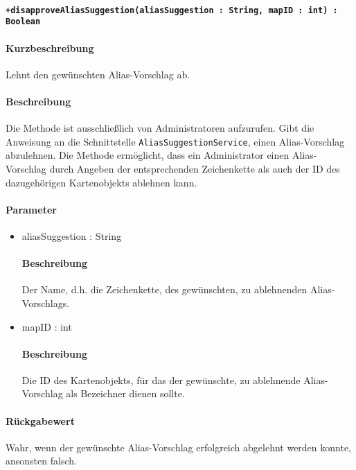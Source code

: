 \paragraph*{\texttt{+disapproveAliasSuggestion(aliasSuggestion : String, mapID : int) : Boolean}}%
\paragraph*{Kurzbeschreibung}
Lehnt den gewünschten Alias-Vorschlag ab.
\paragraph*{Beschreibung}
Die Methode ist ausschließlich von Administratoren aufzurufen.
Gibt die Anweisung an die Schnittstelle \texttt{AliasSuggestionService}, einen Alias-Vorschlag abzulehnen.
Die Methode ermöglicht, dass ein Administrator einen Alias-Vorschlag durch Angeben der entsprechenden Zeichenkette als auch der ID des dazugehörigen Kartenobjekts ablehnen kann.
\paragraph*{Parameter}
\begin{itemize}
	\item aliasSuggestion : String
		\paragraph*{Beschreibung}
		Der Name, d.h. die Zeichenkette, des gewünschten, zu ablehnenden Alias-Vorschlags.
	\item mapID : int
		\paragraph*{Beschreibung}
		Die ID des Kartenobjekts, für das der gewünschte, zu ablehnende Alias-Vorschlag als Bezeichner dienen sollte.
\end{itemize}
\paragraph*{Rückgabewert}
Wahr, wenn der gewünschte Alias-Vorschlag erfolgreich abgelehnt werden konnte, ansonsten falsch.
